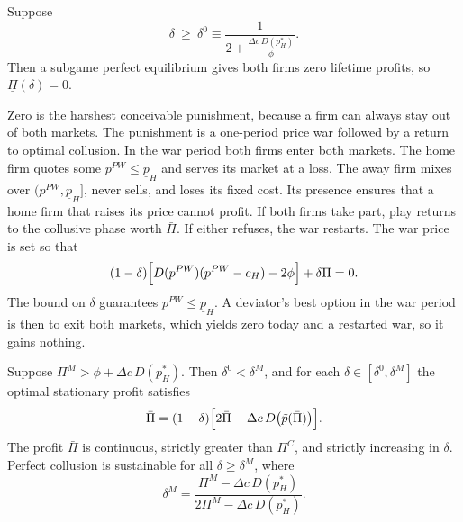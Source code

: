\begin{theorem}\label{thm:13-bm-punish}
Suppose
\[
\delta\ \ge\ \delta^0\equiv\frac{1}{2+\frac{\Delta c\,D(p_H^*)}{\phi}} .
\]
Then a subgame perfect equilibrium gives both firms zero lifetime profits, so $\underline\Pi(\delta)=0$.
\end{theorem}

Zero is the harshest conceivable punishment, because a firm can always stay out of both markets. The
punishment is a one-period price war followed by a return to optimal collusion. In the war period both firms
enter both markets. The home firm quotes some $p^{PW}\le\underline p_H$ and serves its market at a loss. The
away firm mixes over $(p^{PW},\underline p_H]$, never sells, and loses its fixed cost. Its presence ensures
that a home firm that raises its price cannot profit. If both firms take part, play returns to the
collusive phase worth $\bar\Pi$. If either refuses, the war restarts. The war price is set so that
\[
(1-\delta)\Bigl[D(p^{PW})(p^{PW}-c_H)-2\phi\Bigr]+\delta\bar\Pi=0 .
\]
The bound on $\delta$ guarantees $p^{PW}\le\underline p_H$. A deviator's best option in the war period is then
to exit both markets, which yields zero today and a restarted war, so it gains nothing.

\begin{theorem}\label{thm:13-bm-perfect}
Suppose $\Pi^M>\phi+\Delta c\,D(p_H^*)$. Then $\delta^0<\delta^M$, and for each $\delta\in[\delta^0,\delta^M]$
the optimal stationary profit satisfies
\begin{equation}\label{eq:13-bm-thm4}
\bar\Pi=(1-\delta)\Bigl[2\bar\Pi-\Delta c\,D\bigl(\tilde p(\bar\Pi)\bigr)\Bigr].
\end{equation}
The profit $\bar\Pi$ is continuous, strictly greater than $\Pi^C$, and strictly increasing in $\delta$. Perfect
collusion is sustainable for all $\delta\ge\delta^M$, where
\begin{equation}\label{eq:13-bm-deltaM}
\delta^M=\frac{\Pi^M-\Delta c\,D(p_H^*)}{2\Pi^M-\Delta c\,D(p_H^*)} .
\end{equation}
\end{theorem}

